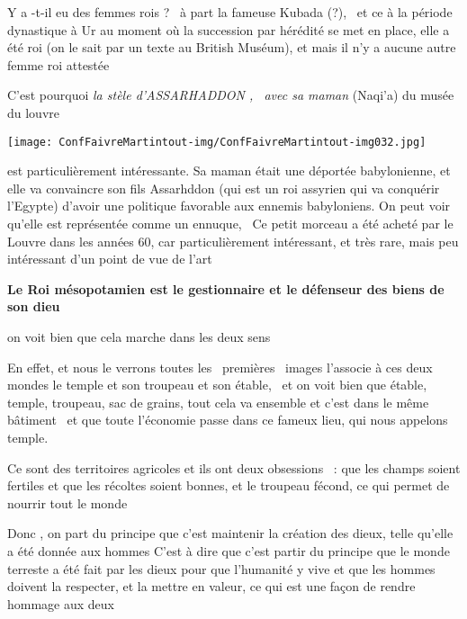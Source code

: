 \documentclass[a4paper]{article}
\begin{document}
\bigskip

{
Y a -t-il eu des femmes rois ? \ à part la fameuse Kubada (?), \ et ce à
la période dynastique à Ur au moment où la succession par hérédité se
met en place, elle a été roi (on le sait par un texte au British
Muséum), et mais il n'y a aucune autre femme roi attestée}


\bigskip

{
C'est pourquoi \textit{la stèle d'ASSARHADDON , \ avec sa maman}
(Naqi'a) du musée du louvre }


\bigskip


\bigskip


\texttt{[image: ConfFaivreMartintout-img/ConfFaivreMartintout-img032.jpg]}



\bigskip

{
est particulièrement intéressante. Sa maman était une déportée
babylonienne, et elle va convaincre son fils Assarhddon (qui est un roi
assyrien qui va conquérir l'Egypte) d'avoir une politique favorable aux
ennemis babyloniens. On peut voir qu'elle est représentée comme un
ennuque, \ Ce petit morceau a été acheté par le Louvre dans les années
60, car particulièrement intéressant, et très rare, mais peu
intéressant d'un point de vue de l'art}


\bigskip

{
\textbf{Le Roi mésopotamien est le gestionnaire et le défenseur des
biens de son dieu}}


\bigskip

{
on voit bien que cela marche dans les deux sens}

{
En effet, et nous le verrons toutes les \ premières \ images l'associe à
ces deux mondes le temple et son troupeau et son étable, \ et on voit
bien que étable, temple, troupeau, sac de grains, tout cela va ensemble
et c'est dans le même bâtiment \ et que toute l'économie passe dans ce
fameux lieu, qui nous appelons temple.}


\bigskip

{
Ce sont des territoires agricoles et ils ont deux obsessions \ : que les
champs soient fertiles et que les récoltes soient bonnes, et le
troupeau fécond, ce qui permet de nourrir tout le monde}


\bigskip

{
Donc , on part du principe que c'est maintenir la création des dieux,
telle qu'elle a été donnée aux hommes C'est à dire que c'est partir du
principe que le monde terreste a été fait par les dieux pour que
l'humanité y vive et que les hommes doivent la respecter, et la mettre
en valeur, ce qui est une façon de rendre hommage aux deux}
\end{document}
